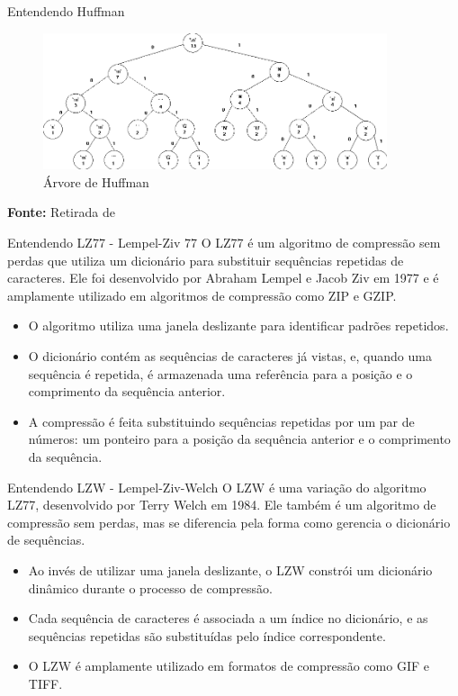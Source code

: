 \documentclass{beamer}
\begin{document}
    \begin{frame}{Entendendo Huffman}
        \begin{figure}
            \centering
            \caption{Árvore de Huffman} %
            \includegraphics[width=0.9\textwidth]{imagens/huffman_tree.png}
        \end{figure}
        \vspace{2mm} %
        \centering
        \textbf{Fonte:} Retirada de \textcolor{blue}{~\cite{islene2007lab4}}%
    \end{frame}

    \begin{frame}{Entendendo LZ77 - Lempel-Ziv 77}
        O LZ77 é um algoritmo de compressão sem perdas que utiliza um dicionário para substituir sequências repetidas de caracteres. Ele foi desenvolvido por Abraham Lempel e Jacob Ziv em 1977 e é amplamente utilizado em algoritmos de compressão como ZIP e GZIP.
        \begin{itemize}
            \item O algoritmo utiliza uma janela deslizante para identificar padrões repetidos.
            \item O dicionário contém as sequências de caracteres já vistas, e, quando uma sequência é repetida, é armazenada uma referência para a posição e o comprimento da sequência anterior.
            \item A compressão é feita substituindo sequências repetidas por um par de números: um ponteiro para a posição da sequência anterior e o comprimento da sequência.
        \end{itemize}
    \end{frame}

    \begin{frame}{Entendendo LZW - Lempel-Ziv-Welch}
        O LZW é uma variação do algoritmo LZ77, desenvolvido por Terry Welch em 1984. Ele também é um algoritmo de compressão sem perdas, mas se diferencia pela forma como gerencia o dicionário de sequências.
        \begin{itemize}
            \item Ao invés de utilizar uma janela deslizante, o LZW constrói um dicionário dinâmico durante o processo de compressão.
            \item Cada sequência de caracteres é associada a um índice no dicionário, e as sequências repetidas são substituídas pelo índice correspondente.
            \item O LZW é amplamente utilizado em formatos de compressão como GIF e TIFF.
        \end{itemize}
    \end{frame}
\end{document}
